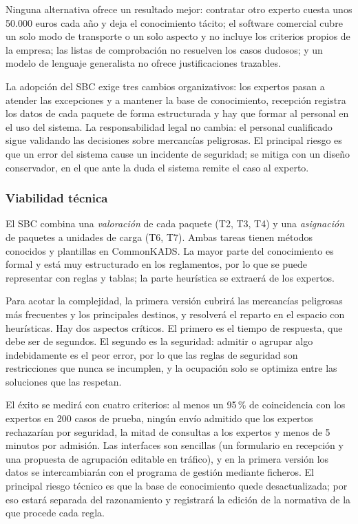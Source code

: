 \documentclass[12pt,a4paper,twoside,spanish]{article}      %
\begin{document}
Ninguna alternativa ofrece un resultado mejor: contratar otro experto cuesta unos 50.000 euros cada año y deja el conocimiento tácito; el software comercial cubre un solo modo de transporte o un solo aspecto y no incluye los criterios propios de la empresa; las listas de comprobación no resuelven los casos dudosos; y un modelo de lenguaje generalista no ofrece justificaciones trazables.

La adopción del SBC exige tres cambios organizativos: los expertos pasan a atender las excepciones y a mantener la base de conocimiento, recepción registra los datos de cada paquete de forma estructurada y hay que formar al personal en el uso del sistema. La responsabilidad legal no cambia: el personal cualificado sigue validando las decisiones sobre mercancías peligrosas. El principal riesgo es que un error del sistema cause un incidente de seguridad; se mitiga con un diseño conservador, en el que ante la duda el sistema remite el caso al experto.

\subsubsection{Viabilidad técnica}

El SBC combina una \textit{valoración} de cada paquete (T2, T3, T4) y una \textit{asignación} de paquetes a unidades de carga (T6, T7). Ambas tareas tienen métodos conocidos y plantillas en CommonKADS. La mayor parte del conocimiento es formal y está muy estructurado en los reglamentos, por lo que se puede representar con reglas y tablas; la parte heurística se extraerá de los expertos.

Para acotar la complejidad, la primera versión cubrirá las mercancías peligrosas más frecuentes y los principales destinos, y resolverá el reparto en el espacio con heurísticas. Hay dos aspectos críticos. El primero es el tiempo de respuesta, que debe ser de segundos. El segundo es la seguridad: admitir o agrupar algo indebidamente es el peor error, por lo que las reglas de seguridad son restricciones que nunca se incumplen, y la ocupación solo se optimiza entre las soluciones que las respetan.

El éxito se medirá con cuatro criterios: al menos un 95\,\% de coincidencia con los expertos en 200 casos de prueba, ningún envío admitido que los expertos rechazarían por seguridad, la mitad de consultas a los expertos y menos de 5 minutos por admisión. Las interfaces son sencillas (un formulario en recepción y una propuesta de agrupación editable en tráfico), y en la primera versión los datos se intercambiarán con el programa de gestión mediante ficheros. El principal riesgo técnico es que la base de conocimiento quede desactualizada; por eso estará separada del razonamiento y registrará la edición de la normativa de la que procede cada regla.
\end{document}
